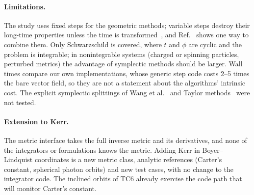 \paragraph{Limitations.} The study uses fixed steps for the geometric methods; variable steps
destroy their long-time properties unless the time is transformed~\cite{calvo1993,gni2006},
and Ref.~\cite{seyrich2012} shows one way to combine them. Only Schwarzschild is covered,
where $t$ and $\phi$ are cyclic and the problem is integrable; in nonintegrable systems
(charged or spinning particles, perturbed metrics) the advantage of symplectic methods should
be larger. Wall times compare our own implementations, whose generic step code costs 2--5
times the bare vector field, so they are not a statement about the algorithms' intrinsic
cost. The explicit symplectic splittings of Wang et al.~\cite{wang2021} and Taylor
methods~\cite{biscani2021} were not tested.

\paragraph{Extension to Kerr.} The metric interface takes the full inverse metric and its
derivatives, and none of the integrators or formulations knows the metric. Adding Kerr in
Boyer--Lindquist coordinates is a new metric class, analytic references (Carter's constant,
spherical photon orbits) and new test cases, with no change to the integrator code. The
inclined orbits of TC6 already exercise the code path that will monitor Carter's constant.
